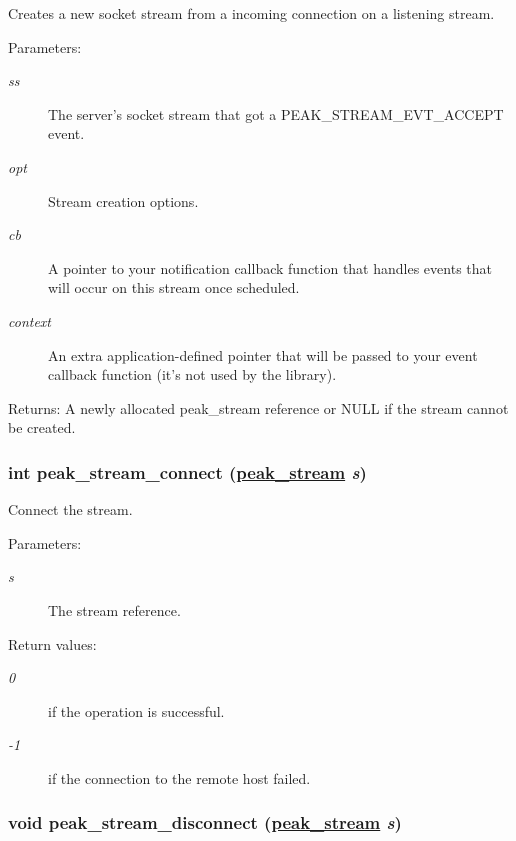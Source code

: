 Creates a new socket stream from a incoming connection on a listening stream. 

\begin{Desc}
\item[Parameters:]
\begin{description}
\item[{\em ss}]The server's socket stream that got a PEAK\_\-STREAM\_\-EVT\_\-ACCEPT event. \item[{\em opt}]Stream creation options. \item[{\em cb}]A pointer to your notification callback function that handles events that will occur on this stream once scheduled. \item[{\em context}]An extra application-defined pointer that will be passed to your event callback function (it's not used by the library).\end{description}
\end{Desc}
\begin{Desc}
\item[Returns:]A newly allocated peak\_\-stream reference or NULL if the stream cannot be created. \end{Desc}
\hypertarget{group__stream__common_ga7}{
\subsubsection[peak\_\-stream\_\-connect]{\setlength{\rightskip}{0pt plus 5cm}int peak\_\-stream\_\-connect (\hyperlink{group__stream_ga0}{peak\_\-stream} {\em s})}}
\label{group__stream__common_ga7}


Connect the stream. 

\begin{Desc}
\item[Parameters:]
\begin{description}
\item[{\em s}]The stream reference.\end{description}
\end{Desc}
\begin{Desc}
\item[Return values:]
\begin{description}
\item[{\em 0}]if the operation is successful. \item[{\em -1}]if the connection to the remote host failed. \end{description}
\end{Desc}
\hypertarget{group__stream__common_ga8}{
\subsubsection[peak\_\-stream\_\-disconnect]{\setlength{\rightskip}{0pt plus 5cm}void peak\_\-stream\_\-disconnect (\hyperlink{group__stream_ga0}{peak\_\-stream} {\em s})}}
\label{group__stream__common_ga8}


